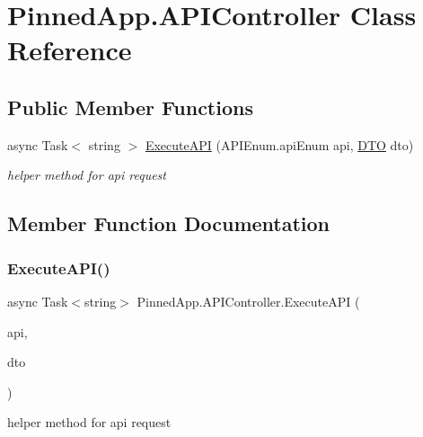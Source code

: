 \hypertarget{class_pinned_app_1_1_a_p_i_controller}{}\section{Pinned\+App.\+A\+P\+I\+Controller Class Reference}
\label{class_pinned_app_1_1_a_p_i_controller}
\subsection*{Public Member Functions}
\begin{DoxyCompactItemize}
\item 
async Task$<$ string $>$ \hyperlink{class_pinned_app_1_1_a_p_i_controller_a3e721dc524e694242ba37c12e5059a91}{Execute\+A\+PI} (A\+P\+I\+Enum.\+api\+Enum api, \hyperlink{class_pinned_app_1_1_d_t_o}{D\+TO} dto)
\begin{DoxyCompactList}\small\item\em helper method for api request \end{DoxyCompactList}\end{DoxyCompactItemize}


\subsection{Member Function Documentation}
\mbox{\label{class_pinned_app_1_1_a_p_i_controller_a3e721dc524e694242ba37c12e5059a91}} 
\subsubsection{\texorpdfstring{Execute\+A\+P\+I()}{ExecuteAPI()}}
{\footnotesize\ttfamily async Task$<$string$>$ Pinned\+App.\+A\+P\+I\+Controller.\+Execute\+A\+PI (\begin{DoxyParamCaption}\item[{A\+P\+I\+Enum.\+api\+Enum}]{api,  }\item[{\hyperlink{class_pinned_app_1_1_d_t_o}{D\+TO}}]{dto }\end{DoxyParamCaption})}



helper method for api request 


